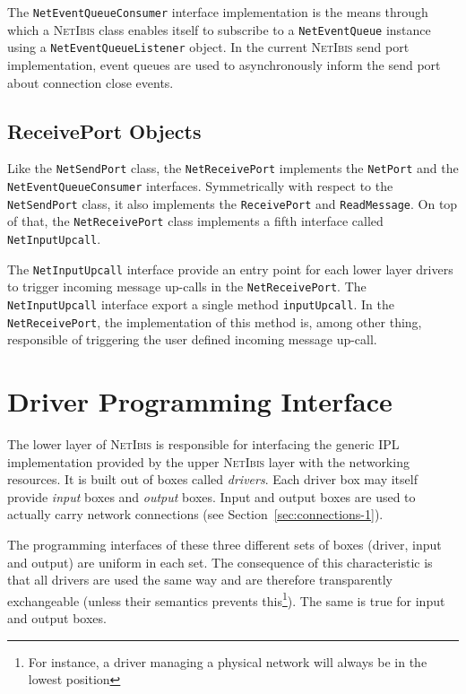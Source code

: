 \documentclass[11pt]{book}
\def\NetIbis{\textsc{NetIbis}\xspace}
\begin{document}
The \texttt{NetEventQueueConsumer} interface implementation is the means
through which a \NetIbis class enables itself to subscribe to a
\texttt{NetEventQueue} instance using a \texttt{NetEventQueueListener}
object. In the current \NetIbis send port implementation, event queues
are used to asynchronously inform the send port about connection close
events.

\subsection{ReceivePort Objects}
\label{sec:receiveport-objects}

Like the \texttt{NetSendPort} class, the \texttt{NetReceivePort}
implements the \texttt{NetPort} and the \texttt{NetEventQueueConsumer}
interfaces. Symmetrically with respect to the \texttt{NetSendPort}
class, it also implements the \texttt{ReceivePort} and
\texttt{ReadMessage}. On top of that, the \texttt{NetReceivePort}
class implements a fifth interface called \texttt{NetInputUpcall}.

The \texttt{NetInputUpcall} interface provide an entry point for each
lower layer drivers to trigger incoming message up-calls in the
\texttt{NetReceivePort}. The \texttt{NetInputUpcall} interface export
a single method \texttt{inputUpcall}. In the \texttt{NetReceivePort},
the implementation of this method is, among other thing, responsible
of triggering the user defined incoming message up-call.

\section{Driver Programming Interface}
\label{sec:driv-progr-interf}

The lower layer of \NetIbis is responsible for interfacing the generic
IPL implementation provided by the upper \NetIbis layer with the
networking resources. It is built out of boxes called \emph{drivers}.
Each driver box may itself provide \emph{input} boxes and
\emph{output} boxes. Input and output boxes are used to actually carry
network connections (see Section~\ref{sec:connections-1}).

The programming interfaces of these three different sets of boxes
(driver, input and output) are uniform in each set. The consequence of
this characteristic is that all drivers are used the same way and are
therefore transparently exchangeable (unless their semantics prevents
this\footnote{For instance, a driver managing a physical network will
  always be in the lowest position}). The same is true for input and
output boxes.
\end{document}
